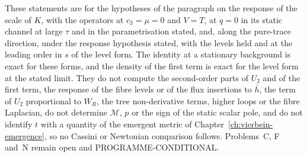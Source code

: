 These statements are for the hypotheses of the paragraph on the response of the scale of \(K\), with the operators at \(c_3=\mu=0\) and \(V=T\), at \(q=0\) in its static channel at large \(\tau\) and in the parametrisation stated, and, along the pure-trace direction, under the response hypothesis stated, with the levels held and at the leading order in \(s\) of the level form. The identity at a stationary background is exact for these forms, and the density of the first term is exact for the level form at the stated limit. They do not compute the second-order parts of \(U_2\) and of the first term, the response of the fibre levels or of the flux insertions to \(\bar h\), the term of \(U_2\) proportional to \(W_R\), the tree non-derivative terms, higher loops or the fibre Laplacian, do not determine \(\mathcal M\), \(p\) or the sign of the static scalar pole, and do not identify \(t\) with a quantity of the emergent metric of Chapter~\ref{ch:vierbein-emergence}, so no Cassini or Newtonian comparison follows. Problems~C, F and~N remain open and PROGRAMME-CONDITIONAL.